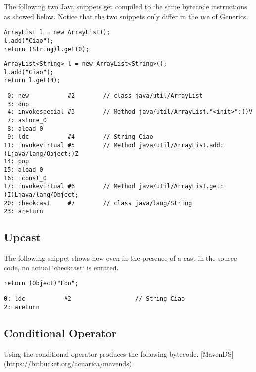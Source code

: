 \documentclass{usiinfdocprop}
\begin{document}
The following two Java snippets get compiled to the same bytecode instructions as showed below. 
Notice that the two snippets only differ in the use of Generics. 

\lstset{language=java,label= ,caption= ,captionpos=b,numbers=none}
\begin{lstlisting}
ArrayList l = new ArrayList(); 
l.add("Ciao"); 
return (String)l.get(0); 
\end{lstlisting}

\lstset{language=java,label= ,caption= ,captionpos=b,numbers=none}
\begin{lstlisting}
ArrayList<String> l = new ArrayList<String>(); 
l.add("Ciao"); 
return l.get(0); 
\end{lstlisting}

\begin{verbatim}
 0: new           #2        // class java/util/ArrayList 
 3: dup 
 4: invokespecial #3        // Method java/util/ArrayList."<init>":()V 
 7: astore_0 
 8: aload_0 
 9: ldc           #4        // String Ciao 
11: invokevirtual #5        // Method java/util/ArrayList.add:(Ljava/lang/Object;)Z 
14: pop 
15: aload_0 
16: iconst_0 
17: invokevirtual #6        // Method java/util/ArrayList.get:(I)Ljava/lang/Object; 
20: checkcast     #7        // class java/lang/String 
23: areturn 
\end{verbatim}

\subsection{Upcast}
\label{sec:orgdc8750a}

The following snippet shows how even in the presence of a cast in the source code, 
no actual `checkcast` is emitted. 

\lstset{language=java,label= ,caption= ,captionpos=b,numbers=none}
\begin{lstlisting}
return (Object)"Foo"; 
\end{lstlisting}

\begin{verbatim}
0: ldc           #2                  // String Ciao 
2: areturn 
\end{verbatim}

\subsection{Conditional Operator}
\label{sec:orgbeee934}

Using the conditional operator produces the following bytecode. 
[MavenDS](\url{https://bitbucket.org/acuarica/mavends}) 
\end{document}
